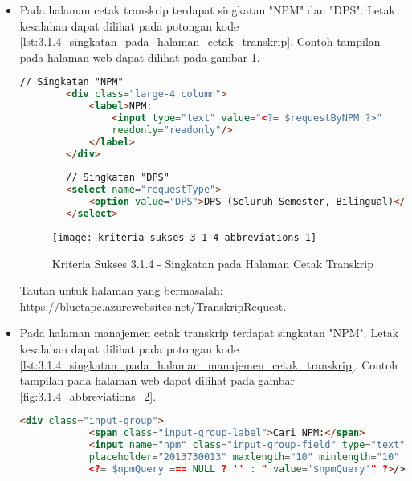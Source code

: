 \begin{itemize}
    \item Pada halaman cetak transkrip terdapat singkatan "NPM" dan "DPS". Letak kesalahan dapat dilihat pada potongan kode \ref{lst:3.1.4_singkatan_pada_halaman_cetak_transkrip}. Contoh tampilan pada halaman web dapat dilihat pada gambar \ref{fig:3.1.4_abbreviations_1}.
    \begin{lstlisting}[frame=single, label={lst:3.1.4_singkatan_pada_halaman_cetak_transkrip}, language=HTML, caption=Kriteria Sukses 3.1.4 - Singkatan pada Halaman Cetak Transkrip]
        // Singkatan "NPM"
        <div class="large-4 column">
            <label>NPM:
                <input type="text" value="<?= $requestByNPM ?>" 
                readonly="readonly"/>
            </label>
        </div>
        
        // Singkatan "DPS"
        <select name="requestType">
            <option value="DPS">DPS (Seluruh Semester, Bilingual)</option>
        </select>
    \end{lstlisting}

    \begin{figure}[H]
        \centering  
        \texttt{[image: kriteria-sukses-3-1-4-abbreviations-1]}  
        \caption[Kriteria Sukses 3.1.4 - Singkatan pada Halaman Cetak Transkrip]{Kriteria Sukses 3.1.4 - Singkatan pada Halaman Cetak Transkrip}
        \label{fig:3.1.4_abbreviations_1}  
    \end{figure}
    Tautan untuk halaman yang bermasalah: \url{https://bluetape.azurewebsites.net/TranskripRequest}.

    \item Pada halaman manajemen cetak transkrip terdapat singkatan "NPM". Letak kesalahan dapat dilihat pada potongan kode \ref{lst:3.1.4_singkatan_pada_halaman_manajemen_cetak_transkrip}. Contoh tampilan pada halaman web dapat dilihat pada gambar \ref{fig:3.1.4_abbreviations_2}.
    \begin{lstlisting}[frame=single, label={lst:3.1.4_singkatan_pada_halaman_manajemen_cetak_transkrip}, language=HTML, caption=Kriteria Sukses 3.1.4 - Singkatan pada Halaman Manajemen Cetak Transkrip]
        <div class="input-group">
            <span class="input-group-label">Cari NPM:</span>
            <input name="npm" class="input-group-field" type="text" 
            placeholder="2013730013" maxlength="10" minlength="10"
            <?= $npmQuery === NULL ? '' : " value='$npmQuery'" ?>/>
    \end{lstlisting}


\end{itemize}
